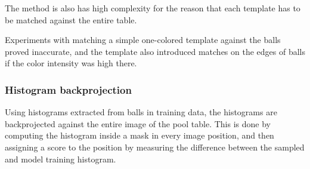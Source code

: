 The method is also has high complexity for the reason that each template has to be matched against the entire table.

Experiments with matching a simple one-colored template against the balls proved inaccurate, and the template also introduced matches on the edges of balls if the color intensity was high there.

\subsubsection{Histogram backprojection}
Using histograms extracted from balls in training data, the histograms are backprojected against the entire image of the pool table. This is done by computing the histogram inside a mask in every image position, and then assigning a score to the position by measuring the difference between the sampled and model training histogram.

